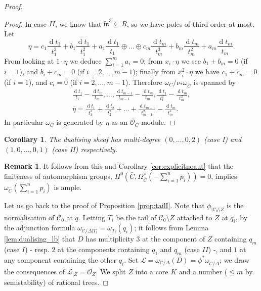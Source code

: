 \documentclass[11pt]{amsart}
\newcommand{\tm}{\widetilde{\mathfrak m}}
\newcommand{\OO}{\mathcal O}
\newcommand{\dvr}{\Delta}
\theoremstyle{plain}
\newtheorem{cor}[thm]{Corollary}
\theoremstyle{definition}
\newtheorem{rem}[thm]{Remark}
\begin{document}
\begin{proof}
\begin{proof}
In case $I\!I$, we know that $\tm^3\subseteq R$, so we have poles of third order at most. Let \[\eta=c_1\frac{\operatorname{d}t_1}{t_1^3}+b_1\frac{\operatorname{d}t_1}{t_1^2}+a_1\frac{\operatorname{d}t_1}{t_1}\oplus\ldots\oplus c_m\frac{\operatorname{d}t_m}{t_m^3}+b_m\frac{\operatorname{d}t_m}{t_m^2}+a_m\frac{\operatorname{d}t_m}{t_m}.\]
 From looking at $1\cdot\eta$ we deduce $\sum_{i=1}^m a_i=0$; from $x_i\cdot\eta$ we see $b_1+b_m=0$ (if $i=1$), and $b_i+c_m=0$ (if $i=2,\ldots,m-1$); finally from $x_i^2\cdot\eta$ we have $c_1+c_m=0$ (if $i=1$), and $c_i=0$ (if $i=2,\ldots,m-1$). Therefore $\omega_C/\nu_*\omega_{\tilde C}$ is spanned by
 \begin{align*}
  \frac{\operatorname{d}t_1}{t_1}-\frac{\operatorname{d}t_m}{t_m},\ldots,\frac{\operatorname{d}t_{m-1}}{t_{m-1}}-\frac{\operatorname{d}t_m}{t_m},\frac{\operatorname{d}t_1}{t_1^2}-\frac{\operatorname{d}t_m}{t_m^2},\\
  \bar{\eta}=\frac{\operatorname{d}t_1}{t_1^3}+\frac{\operatorname{d}t_2}{t_2^2}+\ldots+\frac{\operatorname{d}t_{m-1}}{t_{m-1}^2}-\frac{\operatorname{d}t_m}{t_m^3}.
 \end{align*}
In particular $\omega_C$ is generated by $\bar{\eta}$ as an $\OO_C$-module.

\end{proof}

\begin{cor}\label{cor:deg_dualising}
 The dualising sheaf has multi-degree $(0,\ldots,0,2)$ (case I) and $(1,0,\ldots,0,1)$ (case II) respectively.
\end{cor}

\begin{rem}
 It follows from this and Corollary \ref{cor:explicitnoaut} that the finiteness of automorphism groups, $H^0(\bar C,\Omega_{\bar C}^\vee(-\sum_{i=1}^np_i))=0$, implies $\omega_{\bar C}(\sum_{i=1}^np_i)$ is ample.
\end{rem}
Let us go back to the proof of Proposition \ref{prop:tailI}. Note that $\phi_{|\mathcal C_0\setminus Z}$ is the normalisation of $\overline{\mathcal C}_0$ at $q$. Letting $T_i$ be the tail of $\mathcal C_0\setminus Z$ attached to $Z$ at $q_i$, by the adjunction formula $\omega_{\mathcal C/\dvr|T_i}=\omega_{T_i}(q_i)$; it follows from Lemma \ref{lem:dualising_lb} that $D$ has multiplicity $3$ at the component of $Z$ containing $q_m$ (case $I$) - resp. $2$ at the components containing $q_1$ and $q_m$ (case $I\!I$) -, and $1$ at any component containing the other $q_i$. Set $\mathcal L=\omega_{\mathcal C/\dvr}(D)=\phi^*\omega_{\overline{\mathcal C}/\dvr}$; we draw the consequences of $\mathcal L_{|Z}=\OO_Z$. We split $Z$ into a core $K$ and a number ($\leq m$ by semistability) of rational trees.


\end{proof}
\end{document}
